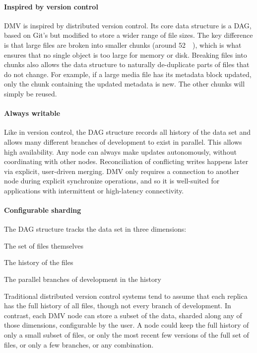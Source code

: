 

\paragraph{Inspired by version control}

\gls{DMV} is inspired by distributed version control. Its core data structure is
a \gls{DAG}, based on Git's but modified to store a wider range of file sizes.
The key difference is that large files are broken into smaller chunks (around
\SI{52}{\kibi\byte}), which is what ensures that no single object is too large
for memory or disk. Breaking files into chunks also allows the data structure to
naturally de-duplicate parts of files that do not change. For example, if a
large media file has its metadata block updated, only the chunk containing the
updated metadata is new. The other chunks will simply be reused.


\paragraph{Always writable}

Like in version control, the \gls{DAG} structure records all history of the data
set and allows many different branches of development to exist in parallel. This
allows high availability. Any node can always make updates autonomously, without
coordinating with other nodes. Reconciliation of conflicting writes happens
later via explicit, user-driven merging. \gls{DMV} only requires a connection to
another node during explicit synchronize operations, and so it is well-suited
for applications with intermittent or high-latency connectivity.


\paragraph{Configurable sharding}

The \gls{DAG} structure tracks the data set in three dimensions:

\begin{tight_enumerate}
    \item The set of files themselves
    \item The history of the files
    \item The parallel branches of development in the history
\end{tight_enumerate}

Traditional distributed version control systems tend to assume that each replica
has the full history of all files, though not every branch of development. In
contrast, each \gls{DMV} node can store a subset of the data, sharded along any
of those dimensions, configurable by the user. A node could keep the full
history of only a small subset of files, or only the most recent few versions of
the full set of files, or only a few branches, or any combination. 


